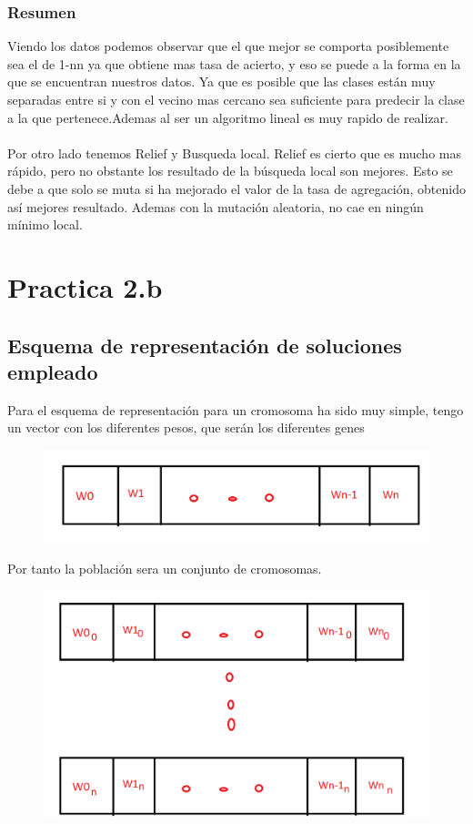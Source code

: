 \documentclass[12pt,a4paper]{article}
\begin{document}
\subsubsection{Resumen}
Viendo los datos podemos observar que el que mejor se comporta posiblemente sea el de 1-nn ya que obtiene mas tasa de acierto, y eso se puede a la forma en la que se encuentran nuestros datos. Ya que es posible que las clases están muy separadas entre si y con el vecino mas cercano sea suficiente para predecir la clase a la que pertenece.Ademas al ser un algoritmo lineal es muy rapido de realizar. \\\\
Por otro lado tenemos Relief y Busqueda local. Relief es cierto que es mucho mas rápido, pero no obstante los resultado de la búsqueda local son mejores. Esto se debe a que solo se muta si ha mejorado el valor de la tasa de agregación, obtenido así mejores resultado. Ademas con la mutación aleatoria, no cae en ningún mínimo local.
\section{Practica 2.b}

\subsection{Esquema de representación de soluciones empleado}

Para el esquema de representación para un cromosoma ha sido muy simple, tengo un vector con los diferentes pesos, que serán los diferentes genes

\begin{figure}[H]
	\centering
	\includegraphics[width=0.7\linewidth]{images/pesos}
	\caption{}
	\label{fig:pesos}
\end{figure}

Por tanto la población sera un conjunto de cromosomas.
\begin{figure}[H]
	\centering
	\includegraphics[width=0.7\linewidth]{images/poblacion}
	\caption{}
	\label{fig:poblacion}
\end{figure}
\end{document}
